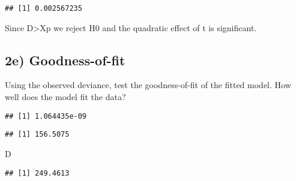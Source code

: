 \documentclass[
]{article}
\newenvironment{Shaded}{\begin{snugshade}}{\end{snugshade}}
\newcommand{\CommentTok}[1]{\textcolor[rgb]{0.56,0.35,0.01}{\textit{#1}}}
\newcommand{\DecValTok}[1]{\textcolor[rgb]{0.00,0.00,0.81}{#1}}
\newcommand{\FloatTok}[1]{\textcolor[rgb]{0.00,0.00,0.81}{#1}}
\newcommand{\KeywordTok}[1]{\textcolor[rgb]{0.13,0.29,0.53}{\textbf{#1}}}
\newcommand{\NormalTok}[1]{#1}
\newcommand{\OperatorTok}[1]{\textcolor[rgb]{0.81,0.36,0.00}{\textbf{#1}}}
\newcommand{\StringTok}[1]{\textcolor[rgb]{0.31,0.60,0.02}{#1}}
\begin{document}
\begin{verbatim}
## [1] 0.002567235
\end{verbatim}

Since D\textgreater Xp we reject H0 and the quadratic effect of t is
significant.

\hypertarget{e-goodness-of-fit}{%
\subsection{2e) Goodness-of-fit}\label{e-goodness-of-fit}}

Using the observed deviance, test the goodness-of-fit of the fitted
model. How well does the model fit the data?

\begin{Shaded}
\end{Shaded}

\begin{verbatim}
## [1] 1.064435e-09
\end{verbatim}

\begin{Shaded}
\end{Shaded}

\begin{verbatim}
## [1] 156.5075
\end{verbatim}

\begin{Shaded}
\begin{Highlighting}[]
\NormalTok{D}
\end{Highlighting}
\end{Shaded}

\begin{verbatim}
## [1] 249.4613
\end{verbatim}
\end{document}
